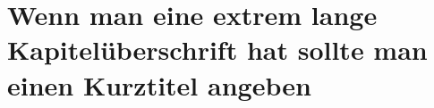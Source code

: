 \section{Wenn man eine extrem lange Kapitelüberschrift hat sollte man einen Kurztitel angeben}
\label{sec:Kapitel2}
